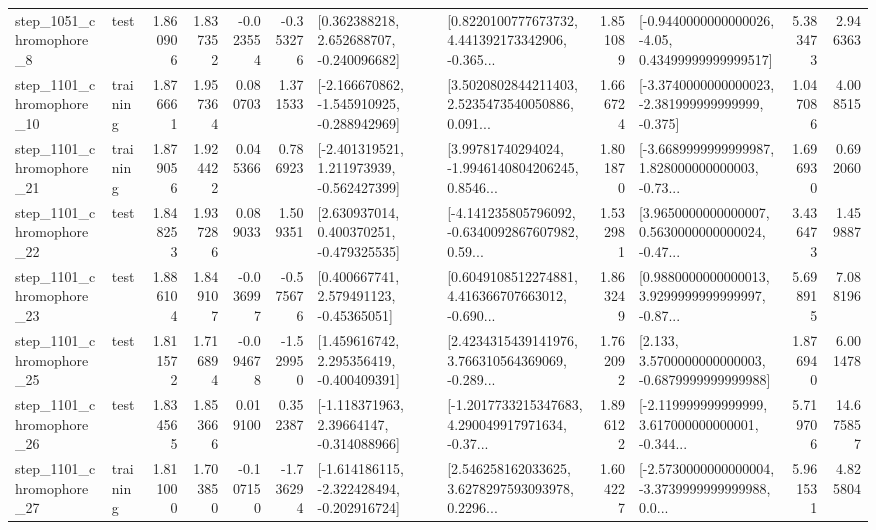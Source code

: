 \begin{tabular}{llrrrrllrlrr}
  step\_1051\_chromophore\_8 &      test &      1.860906 &    1.837352 &     -0.023554 & -0.353276 &    [0.362388218, 2.652688707, -0.240096682] &  [0.8220100777673732, 4.441392173342906, -0.365... &       1.851089 &  [-0.9440000000000026, -4.05, 0.43499999999999517] &            5.383473 &          2.946363 \\
 step\_1101\_chromophore\_10 &  training &      1.876661 &    1.957364 &      0.080703 &  1.371533 &  [-2.166670862, -1.545910925, -0.288942969] &  [3.5020802844211403, 2.5235473540050886, 0.091... &       1.666724 &  [-3.3740000000000023, -2.381999999999999, -0.375] &            1.047086 &          4.008515 \\
 step\_1101\_chromophore\_21 &  training &      1.879056 &    1.924422 &      0.045366 &  0.786923 &   [-2.401319521, 1.211973939, -0.562427399] &  [3.99781740294024, -1.9946140804206245, 0.8546... &       1.801870 &  [-3.6689999999999987, 1.828000000000003, -0.73... &            1.696930 &          0.692060 \\
 step\_1101\_chromophore\_22 &      test &      1.848253 &    1.937286 &      0.089033 &  1.509351 &    [2.630937014, 0.400370251, -0.479325535] &  [-4.141235805796092, -0.6340092867607982, 0.59... &       1.532981 &  [3.9650000000000007, 0.5630000000000024, -0.47... &            3.436473 &          1.459887 \\
 step\_1101\_chromophore\_23 &      test &      1.886104 &    1.849107 &     -0.036997 & -0.575676 &     [0.400667741, 2.579491123, -0.45365051] &  [0.6049108512274881, 4.416366707663012, -0.690... &       1.863249 &  [0.9880000000000013, 3.9299999999999997, -0.87... &            5.698915 &          7.088196 \\
 step\_1101\_chromophore\_25 &      test &      1.811572 &    1.716894 &     -0.094678 & -1.529950 &    [1.459616742, 2.295356419, -0.400409391] &  [2.4234315439141976, 3.766310564369069, -0.289... &       1.762092 &   [2.133, 3.5700000000000003, -0.6879999999999988] &            1.876940 &          6.001478 \\
 step\_1101\_chromophore\_26 &      test &      1.834565 &    1.853666 &      0.019100 &  0.352387 &    [-1.118371963, 2.39664147, -0.314088966] &  [-1.2017733215347683, 4.290049917971634, -0.37... &       1.896122 &  [-2.119999999999999, 3.617000000000001, -0.344... &            5.719706 &         14.675857 \\
 step\_1101\_chromophore\_27 &  training &      1.811000 &    1.703850 &     -0.107150 & -1.736294 &  [-1.614186115, -2.322428494, -0.202916724] &  [2.546258162033625, 3.6278297593093978, 0.2296... &       1.604227 &  [-2.5730000000000004, -3.3739999999999988, 0.0... &            5.961531 &          4.825804 \\

\end{tabular}
